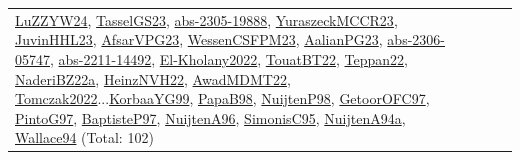 {\begin{longtable}{p{3cm}r>{\raggedright\arraybackslash}p{6cm}>{\raggedright\arraybackslash}p{6cm}>{\raggedright\arraybackslash}p{8cm}}
\hyperref[detail:LuZZYW24]{LuZZYW24}, \hyperref[detail:TasselGS23]{TasselGS23}, \hyperref[detail:abs-2305-19888]{abs-2305-19888}, \hyperref[detail:YuraszeckMCCR23]{YuraszeckMCCR23}, \hyperref[detail:JuvinHHL23]{JuvinHHL23}, \hyperref[detail:AfsarVPG23]{AfsarVPG23}, \hyperref[detail:WessenCSFPM23]{WessenCSFPM23}, \hyperref[detail:AalianPG23]{AalianPG23}, \hyperref[detail:abs-2306-05747]{abs-2306-05747}, \hyperref[detail:abs-2211-14492]{abs-2211-14492}, \hyperref[detail:El-Kholany2022]{El-Kholany2022}, \hyperref[detail:TouatBT22]{TouatBT22}, \hyperref[detail:Teppan22]{Teppan22}, \hyperref[detail:NaderiBZ22a]{NaderiBZ22a}, \hyperref[detail:HeinzNVH22]{HeinzNVH22}, \hyperref[detail:AwadMDMT22]{AwadMDMT22}, \hyperref[detail:Tomczak2022]{Tomczak2022}...\hyperref[detail:KorbaaYG99]{KorbaaYG99}, \hyperref[detail:PapaB98]{PapaB98}, \hyperref[detail:NuijtenP98]{NuijtenP98}, \hyperref[detail:GetoorOFC97]{GetoorOFC97}, \hyperref[detail:PintoG97]{PintoG97}, \hyperref[detail:BaptisteP97]{BaptisteP97}, \hyperref[detail:NuijtenA96]{NuijtenA96}, \hyperref[detail:SimonisC95]{SimonisC95}, \hyperref[detail:NuijtenA94a]{NuijtenA94a}, \hyperref[detail:Wallace94]{Wallace94} (Total: 102)\\

\end{longtable}}

